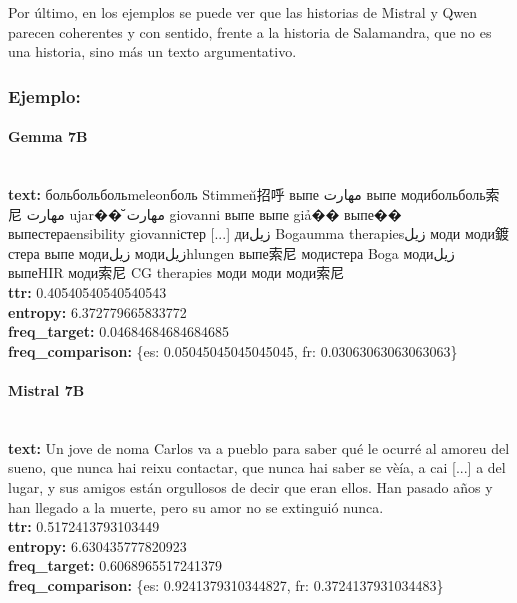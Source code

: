 Por último, en los ejemplos se puede ver que las historias de Mistral y Qwen parecen coherentes y con sentido, frente a la historia de Salamandra, que no es una historia, sino más un texto argumentativo.

\subsubsection{Ejemplo:}

\paragraph{Gemma 7B}~\\
\textbf{text:} больбольбольmeleonболь Stimmen̆招呼 выпе مهارت выпе модибольболь索尼 مهارت ujar�� مهارت̆ giovanni выпе выпе giả�� выпе�� выпестераensibility giovanniстер [...] диزيل Bogaumma therapiesزيل моди моди鍍стера выпе модиزيل модиزيلhlungen выпе索尼 модистера Boga модиزيل выпеHIR моди索尼 CG therapies моди моди моди索尼\\
\textbf{ttr:} 0.40540540540540543\\
\textbf{entropy:} 6.372779665833772\\
\textbf{freq\_target:} 0.04684684684684685\\
\textbf{freq\_comparison:} \{\textquotesingle{}es\textquotesingle{}: 0.05045045045045045, \textquotesingle{}fr\textquotesingle{}: 0.03063063063063063\}

\paragraph{Mistral 7B}~\\
\textbf{text:} Un jove de noma Carlos va a pueblo para saber qué le ocurré al amoreu del sueno, que nunca hai reixu contactar, que nunca hai saber se vèía, a cai [...] a del lugar, y sus amigos están orgullosos de decir que eran ellos. Han pasado años y han llegado a la muerte, pero su amor no se extinguió nunca.\\
\textbf{ttr:} 0.5172413793103449\\
\textbf{entropy:} 6.630435777820923\\
\textbf{freq\_target:} 0.6068965517241379\\
\textbf{freq\_comparison:} \{\textquotesingle{}es\textquotesingle{}: 0.9241379310344827, \textquotesingle{}fr\textquotesingle{}: 0.3724137931034483\}

